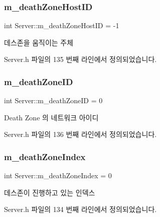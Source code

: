 \subsubsection{\texorpdfstring{m\+\_\+death\+Zone\+Host\+ID}{m\_deathZoneHostID}}
{\footnotesize\ttfamily int Server\+::m\+\_\+death\+Zone\+Host\+ID = -\/1\hspace{0.3cm}{\ttfamily [private]}}



데스존을 움직이는 주체 



Server.\+h 파일의 135 번째 라인에서 정의되었습니다.

\mbox{\label{class_server_a65e72b65d1be2dc79fddb0433402cd81}} 
\subsubsection{\texorpdfstring{m\+\_\+death\+Zone\+ID}{m\_deathZoneID}}
{\footnotesize\ttfamily int Server\+::m\+\_\+death\+Zone\+ID = 0\hspace{0.3cm}{\ttfamily [private]}}



Death Zone 의 네트워크 아이디 



Server.\+h 파일의 136 번째 라인에서 정의되었습니다.

\mbox{\label{class_server_a279c9f26f808acc351f9167ece2d39fb}} 
\subsubsection{\texorpdfstring{m\+\_\+death\+Zone\+Index}{m\_deathZoneIndex}}
{\footnotesize\ttfamily int Server\+::m\+\_\+death\+Zone\+Index = 0\hspace{0.3cm}{\ttfamily [private]}}



데스존이 진행하고 있는 인덱스 



Server.\+h 파일의 134 번째 라인에서 정의되었습니다.

\mbox{\label{class_server_a77f414d5bb41dd5de8626d8cd621113c}} 
